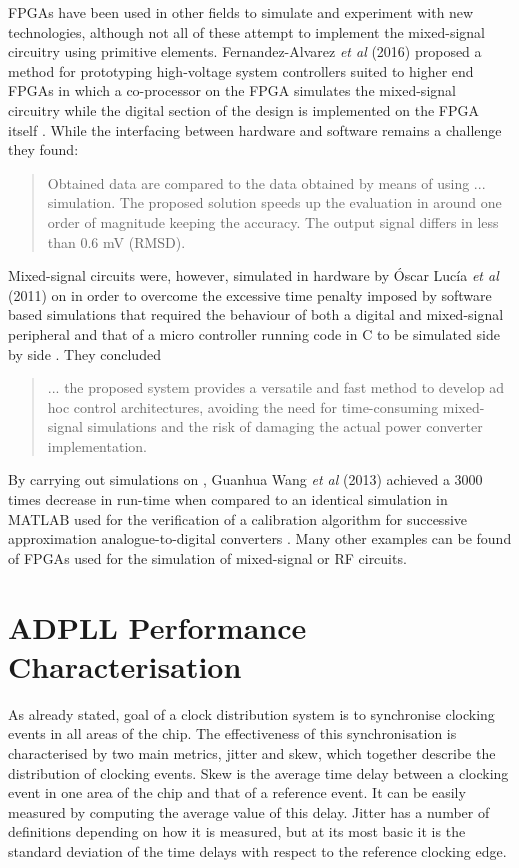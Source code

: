 \ac{FPGA}s have been used in other fields to simulate and experiment with new technologies, although not all of these attempt to implement the mixed-signal circuitry using primitive elements. Fernandez-Alvarez \textit{et al} (2016) proposed a method for prototyping high-voltage system controllers suited to higher end \ac{FPGA}s in which a co-processor on the \ac{FPGA} simulates the mixed-signal circuitry while the digital section of the design is implemented on the \ac{FPGA} itself \cite{fernandez2017hw}. While the interfacing between hardware and software remains a challenge they found:
\begin{quotation}
	Obtained data are compared to the data obtained by means of using ... simulation. The proposed solution speeds up the evaluation in around one order of magnitude keeping the accuracy. The output signal differs in less than 0.6 mV (RMSD).
\end{quotation}

Mixed-signal circuits were, however, simulated in hardware by \'{O}scar Luc\'{i}a \textit{et al} (2011) on  in order to overcome the excessive time penalty imposed by software based simulations that required the behaviour of both a digital and mixed-signal peripheral and that of a micro controller running code in C to be simulated side by side \cite{lucia2011real}. They concluded
\begin{quotation}
	... the proposed system provides a versatile and fast method to develop ad hoc control architectures, avoiding the need for time-consuming mixed-signal simulations and the risk of damaging the actual power converter implementation.
\end{quotation}
By carrying out simulations on , Guanhua Wang \textit{et al} (2013) achieved a 3000 times decrease in run-time when compared to an identical simulation in MATLAB used for the verification of a calibration algorithm for successive approximation analogue-to-digital converters \cite{wang2013fast}. Many other examples can be found of \ac{FPGA}s used for the simulation of mixed-signal or \acs{RF} circuits.

\section{\acs{ADPLL} Performance Characterisation}
As already stated, goal of a clock distribution system is to synchronise clocking events in all areas of the chip. The effectiveness of this synchronisation is characterised by two main metrics, jitter and skew, which together describe the distribution of clocking events. Skew is the average time delay between a clocking event in one area of the chip and that of a reference event. It can be easily measured by computing the average value of this delay. Jitter has a number of definitions depending on how it is measured, but at its most basic it is the standard deviation of the time delays with respect to the reference clocking edge.

